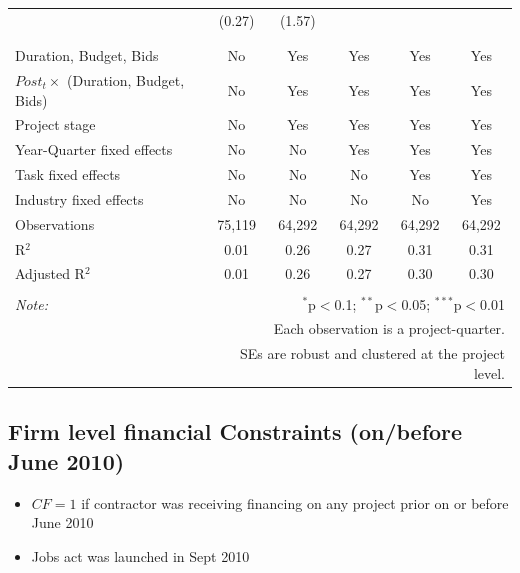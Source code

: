 \documentclass[
]{article}
\providecommand{\tightlist}{%
  \setlength{\itemsep}{0pt}\setlength{\parskip}{0pt}}
\begin{document}
\begin{table}[H]
\begin{tabular}{@{\extracolsep{-2pt}}lccccc}
  & (0.27) & (1.57) &  &  &  \\ 
  & & & & & \\ 
\hline \\[-1.8ex] 
Duration, Budget, Bids & No & Yes & Yes & Yes & Yes \\ 
$Post_t \times $  (Duration, Budget, Bids) & No & Yes & Yes & Yes & Yes \\ 
Project stage & No & Yes & Yes & Yes & Yes \\ 
Year-Quarter fixed effects & No & No & Yes & Yes & Yes \\ 
Task fixed effects & No & No & No & Yes & Yes \\ 
Industry fixed effects & No & No & No & No & Yes \\ 
Observations & 75,119 & 64,292 & 64,292 & 64,292 & 64,292 \\ 
R$^{2}$ & 0.01 & 0.26 & 0.27 & 0.31 & 0.31 \\ 
Adjusted R$^{2}$ & 0.01 & 0.26 & 0.27 & 0.30 & 0.30 \\ 
\hline 
\hline \\[-1.8ex] 
\textit{Note:}  & \multicolumn{5}{r}{$^{*}$p$<$0.1; $^{**}$p$<$0.05; $^{***}$p$<$0.01} \\ 
 & \multicolumn{5}{r}{Each observation is a project-quarter.} \\ 
 & \multicolumn{5}{r}{SEs are robust and clustered at the project level.} \\ 
\end{tabular} 
\end{table}

\hypertarget{firm-level-financial-constraints-onbefore-june-2010}{%
\subsection{Firm level financial Constraints (on/before June
2010)}\label{firm-level-financial-constraints-onbefore-june-2010}}

\begin{itemize}
\tightlist
\item
  \(CF=1\) if contractor was receiving financing on any project prior on
  or before June 2010
\item
  Jobs act was launched in Sept 2010
\end{itemize}
\end{document}
